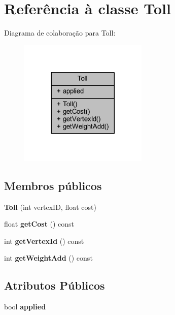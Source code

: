 \hypertarget{class_toll}{}\section{Referência à classe Toll}
\label{class_toll}


Diagrama de colaboração para Toll\+:
\nopagebreak
\begin{figure}[H]
\begin{center}
\leavevmode
\includegraphics[width=173pt]{class_toll__coll__graph}
\end{center}
\end{figure}
\subsection*{Membros públicos}
\begin{DoxyCompactItemize}
\item 
\hypertarget{class_toll_ae7ee55783fc26b0f68a91586e7238a2c}{}{\bfseries Toll} (int vertex\+I\+D, float cost)\label{class_toll_ae7ee55783fc26b0f68a91586e7238a2c}

\item 
\hypertarget{class_toll_a09a987b280dada924f83ca07669f3a9b}{}float {\bfseries get\+Cost} () const \label{class_toll_a09a987b280dada924f83ca07669f3a9b}

\item 
\hypertarget{class_toll_a9b206f487334ea8930a9be1b06e14ca4}{}int {\bfseries get\+Vertex\+Id} () const \label{class_toll_a9b206f487334ea8930a9be1b06e14ca4}

\item 
\hypertarget{class_toll_a5cd8903fb8bfdd46b726291e3409e915}{}int {\bfseries get\+Weight\+Add} () const \label{class_toll_a5cd8903fb8bfdd46b726291e3409e915}

\end{DoxyCompactItemize}
\subsection*{Atributos Públicos}
\begin{DoxyCompactItemize}
\item 
\hypertarget{class_toll_a2744c563ee9430acf43cb8ed92cf44d9}{}bool {\bfseries applied}\label{class_toll_a2744c563ee9430acf43cb8ed92cf44d9}

\end{DoxyCompactItemize}


